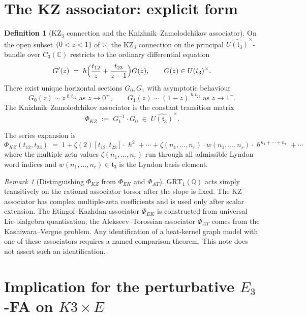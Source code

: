 \documentclass[11pt]{amsart}
\theoremstyle{plain}
\theoremstyle{definition}
\newtheorem{definition}[theorem]{Definition}
\theoremstyle{remark}
\newtheorem{remark}[theorem]{Remark}
\providecommand{\C}{\mathbb{C}}
\providecommand{\Q}{\mathbb{Q}}
\providecommand{\R}{\mathbb{R}}
\providecommand{\GRT}{\mathrm{GRT}}
\providecommand{\frakt}{\mathfrak{t}}
\providecommand{\hbar}{\hslash}
\begin{document}
\section{The KZ associator: explicit form}
\label{sec:kz-explicit}

\begin{definition}[KZ$_3$ connection and the Knizhnik--Zamolodchikov associator]
\label{def:phi-kz}
On the open subset $\{0 < z < 1\}$ of $\R$, the KZ$_3$ connection on the principal $\widehat{U(\frakt_3)}^\times$-bundle over $C_3(\C)$ restricts to the ordinary differential equation
\[
  G'(z) \;=\; \hbar\Bigl( \frac{t_{12}}{z} + \frac{t_{23}}{z - 1} \Bigr) G(z),
  \qquad G(z) \in \widehat{U(\frakt_3)}^\times .
\]
There exist unique horizontal sections $G_0, G_1$ with asymptotic behaviour
\[
  G_0(z) \sim z^{\hbar t_{12}} \;\text{as $z \to 0^+$},\qquad
  G_1(z) \sim (1 - z)^{\hbar t_{23}} \;\text{as $z \to 1^-$}.
\]
The Knizhnik--Zamolodchikov associator is the constant transition matrix
\[
  \Phi_{KZ} \;:=\; G_1^{-1} \cdot G_0 \;\in\; \widehat{U(\frakt_3)}^\times.
\]
\end{definition}

The series expansion is
\[
  \Phi_{KZ}(t_{12}, t_{23}) \;=\; 1 + \zeta(2) [t_{12}, t_{23}] \cdot \hbar^2 + \cdots + \zeta(n_1, \ldots, n_r) \cdot w(n_1, \ldots, n_r) \cdot \hbar^{n_1 + \cdots + n_r} + \cdots
\]
where the multiple zeta values $\zeta(n_1, \ldots, n_r)$ run through all admissible Lyndon-word indices and $w(n_1, \ldots, n_r) \in \frakt_3$ is the Lyndon basis element.

\begin{remark}[Distinguishing $\Phi_{KZ}$ from $\Phi_{EK}$ and $\Phi_{AT}$]
\label{rem:phi-distinguish}
$\GRT_1(\Q)$ acts simply transitively on the rational associator
torsor after the slope is fixed. The KZ associator has complex
multiple-zeta coefficients and is used only after scalar extension.
The Etingof--Kazhdan associator $\Phi_{EK}$ is constructed from
universal Lie-bialgebra quantisation; the Alekseev--Torossian
associator $\Phi_{AT}$ comes from the Kashiwara--Vergne problem. Any
identification of a heat-kernel graph model with one of these
associators requires a named comparison theorem. This note does not
assert such an identification.
\end{remark}

\section{Implication for the perturbative $E_3$-FA on $K3 \times E$}
\label{sec:k3xe-implication}
\end{document}
